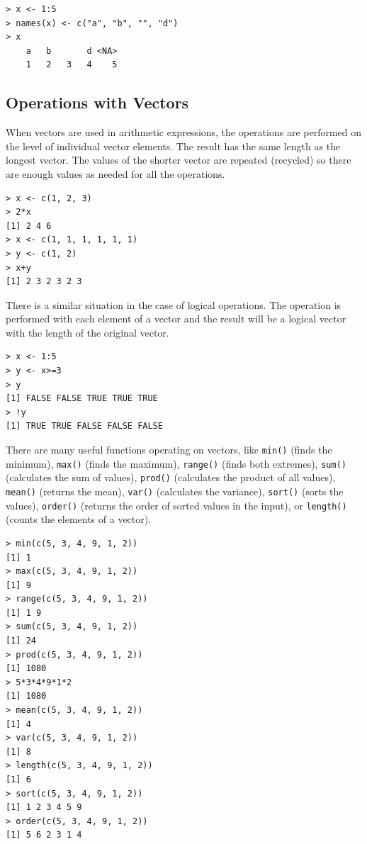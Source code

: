 \begin{verbatim}
> x <- 1:5
> names(x) <- c("a", "b", "", "d")
> x
    a   b       d <NA>
    1   2   3   4    5
\end{verbatim}

\subsection{Operations with Vectors}

When vectors are used in arithmetic expressions, the operations are performed
on the level of individual vector elements. The result has the same length as the
longest vector. The values of the shorter vector are repeated (recycled) so there
are enough values as needed for all the operations.

\begin{verbatim}
> x <- c(1, 2, 3)
> 2*x
[1] 2 4 6
> x <- c(1, 1, 1, 1, 1, 1)
> y <- c(1, 2)
> x+y
[1] 2 3 2 3 2 3
\end{verbatim}

There is a similar situation in the case of logical operations. The operation is
performed with each element of a vector and the result will be a logical vector
with the length of the original vector.

\begin{verbatim}
> x <- 1:5
> y <- x>=3
> y
[1] FALSE FALSE TRUE TRUE TRUE
> !y
[1] TRUE TRUE FALSE FALSE FALSE
\end{verbatim}

There are many useful functions operating on vectors, like 
\texttt{min()} (finds the minimum), 
\texttt{max()} (finds the maximum), 
\texttt{range()} (finds both extremes), 
\texttt{sum()} (calculates the sum of values), 
\texttt{prod()} (calculates the product of all values), 
\texttt{mean()} (returns the mean), 
\texttt{var()} (calculates the variance), 
\texttt{sort()} (sorts the values), 
\texttt{order()} (returns the order of sorted values in the input), 
or \texttt{length()} (counts the elements of a vector).

\begin{verbatim}
> min(c(5, 3, 4, 9, 1, 2))
[1] 1
> max(c(5, 3, 4, 9, 1, 2))
[1] 9
> range(c(5, 3, 4, 9, 1, 2))
[1] 1 9
> sum(c(5, 3, 4, 9, 1, 2))
[1] 24
> prod(c(5, 3, 4, 9, 1, 2))
[1] 1080
> 5*3*4*9*1*2
[1] 1080
> mean(c(5, 3, 4, 9, 1, 2))
[1] 4
> var(c(5, 3, 4, 9, 1, 2))
[1] 8
> length(c(5, 3, 4, 9, 1, 2))
[1] 6
> sort(c(5, 3, 4, 9, 1, 2))
[1] 1 2 3 4 5 9
> order(c(5, 3, 4, 9, 1, 2))
[1] 5 6 2 3 1 4
\end{verbatim}

